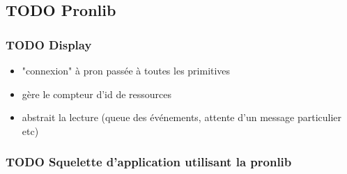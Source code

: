 

\subsection{TODO Pronlib}
\label{Pronlib}

\subsubsection{TODO Display}

\begin{itemize}
  \item "connexion" à pron passée à toutes les primitives
  \item gère le compteur d'id de ressources
  \item abstrait la lecture (queue des événements, attente d'un message particulier etc)
\end{itemize}

\subsubsection{TODO Squelette d'application utilisant la pronlib}
